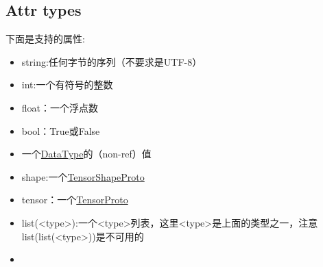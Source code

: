 \documentclass{book}
\begin{document}
\subsection{Attr types}
下面是支持的属性:
\begin{itemize}
\item string:任何字节的序列（不要求是UTF-8）
\item int:一个有符号的整数
\item float：一个浮点数
\item bool：True或False 
\item 一个\href{https://www.github.com/tensorflow/tensorflow/blob/r1.4/tensorflow/core/framework/types.cc}{DataType}的（non-ref）值
\item shape:一个\href{https://www.github.com/tensorflow/tensorflow/blob/r1.4/tensorflow/core/framework/tensor_shape.proto}{TensorShapeProto}
\item tensor：一个\href{https://www.github.com/tensorflow/tensorflow/blob/r1.4/tensorflow/core/framework/tensor.proto}{TensorProto}
\item list(<type>):一个<type>列表，这里<type>是上面的类型之一，注意list(list(<type>))是不可用的
\item
\end{itemize}
\end{document}

